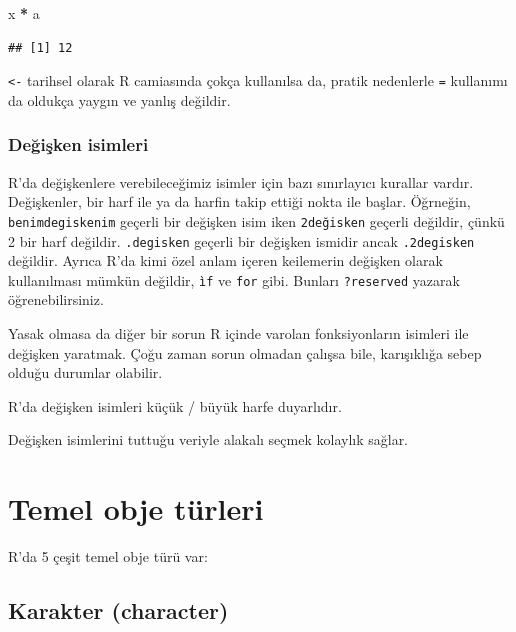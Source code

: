 \documentclass[
]{book}
\newenvironment{Shaded}{\begin{snugshade}}{\end{snugshade}}
\newcommand{\NormalTok}[1]{#1}
\newcommand{\OperatorTok}[1]{\textcolor[rgb]{0.81,0.36,0.00}{\textbf{#1}}}
\newcommand{\StringTok}[1]{\textcolor[rgb]{0.31,0.60,0.02}{#1}}
\begin{document}
\begin{Shaded}
\begin{Highlighting}[]
\NormalTok{x }\OperatorTok{*}\StringTok{ }\NormalTok{a}
\end{Highlighting}
\end{Shaded}

\begin{verbatim}
## [1] 12
\end{verbatim}

\texttt{\textless{}-} tarihsel olarak R camiasında çokça kullanılsa da, pratik nedenlerle \texttt{=} kullanımı da oldukça yaygın ve yanlış değildir.

\hypertarget{deux11fiux15fken-isimleri}{%
\subsection{Değişken isimleri}\label{deux11fiux15fken-isimleri}}

R'da değişkenlere verebileceğimiz isimler için bazı sınırlayıcı kurallar vardır. Değişkenler, bir harf ile ya da harfin takip ettiği nokta ile başlar. Öğrneğin, \texttt{benimdegiskenim} geçerli bir değişken isim iken \texttt{2değisken} geçerli değildir, çünkü 2 bir harf değildir. \texttt{.degisken} geçerli bir değişken ismidir ancak \texttt{.2degisken} değildir. Ayrıca R'da kimi özel anlam içeren keilemerin değişken olarak kullanılması mümkün değildir, \texttt{ìf} ve \texttt{for} gibi. Bunları \texttt{?reserved} yazarak öğrenebilirsiniz.

Yasak olmasa da diğer bir sorun R içinde varolan fonksiyonların isimleri ile değişken yaratmak. Çoğu zaman sorun olmadan çalışsa bile, karışıklığa sebep olduğu durumlar olabilir.

R'da değişken isimleri küçük / büyük harfe duyarlıdır.

Değişken isimlerini tuttuğu veriyle alakalı seçmek kolaylık sağlar.

\hypertarget{temel-obje-tuxfcrleri}{%
\chapter{Temel obje türleri}\label{temel-obje-tuxfcrleri}}

R'da 5 çeşit temel obje türü var:

\hypertarget{karakter-character}{%
\section{Karakter (character)}\label{karakter-character}}
\end{document}

